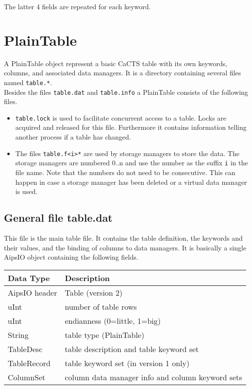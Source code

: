 The latter 4 fields are repeated for each keyword.

\section{PlainTable}
A PlainTable object represent a basic CaCTS table with its own
keywords, columns, and associated data managers. It is a directory
containing several files named \texttt{table.*}.
\\Besides the files \texttt{table.dat} and \texttt{table.info} a
PlainTable consists of the following files.
\begin{itemize}
\item
\texttt{table.lock} is used to facilitate concurrent access
to a table. Locks are acquired and released for this file. Furthermore
it contains information telling another process if a table has changed.
\item
The files \texttt{table.f<i>*} are used by storage managers to store
the data. The storage managers are numbered 0..n and use the number as
the suffix \texttt{i} in the file name. Note that the numbers do not
need to be consecutive. This can happen in case a storage manager has
been deleted or a virtual data manager is used.
\end{itemize}


\subsection{General file table.dat}
This file is the main table file. It contains the table definition,
the keywords and their values, and the binding of columns to data
managers. It is basically a single AipsIO object containing the
following fields.

\vspace{0.15in}
\begin{tabular}{|l|l|} \hline
  Data Type & Description \\ \hline\hline
  AipsIO header & Table (version 2) \\
  uInt & number of table rows \\
  uInt & endianness (0=little, 1=big) \\
  String & table type (PlainTable) \\
  TableDesc & table description and table keyword set \\
  TableRecord & table keyword set (in version 1 only) \\
  ColumnSet & column data manager info and column keyword sets \\
  \hline
\end{tabular}
\vspace{0.15in}

